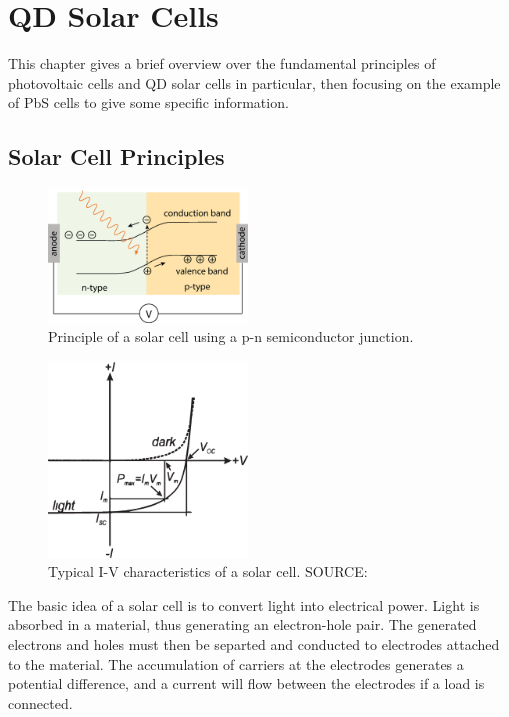 \chapter{QD Solar Cells}

This chapter gives a brief overview over the fundamental principles of photovoltaic cells and QD solar cells in particular, then focusing on the example of PbS cells to give some specific information.

\section{Solar Cell Principles}

\begin{figure}
	\centering
	\includegraphics[width=200px]{Fig/SolarCell/pnSolarCell}
	\caption{Principle of a solar cell using a p-n semiconductor junction.}
	\label{fig:pnSolarCell}
\end{figure}

\begin{figure}
	\centering
	\includegraphics[width=200px]{Fig/SolarCell/IVsolarCell}
	\caption{Typical I-V characteristics of a solar cell. SOURCE: \cite[p.427]{ChemRev}}
	\label{fig:IVsolarCell}
\end{figure}

The basic idea of a solar cell is to convert light into electrical power. Light is absorbed in a material, thus generating an electron-hole pair. The generated electrons and holes must then be separted and conducted to electrodes attached to the material. The accumulation of carriers at the electrodes generates a potential difference, and a current will flow between the electrodes if a load is connected.

